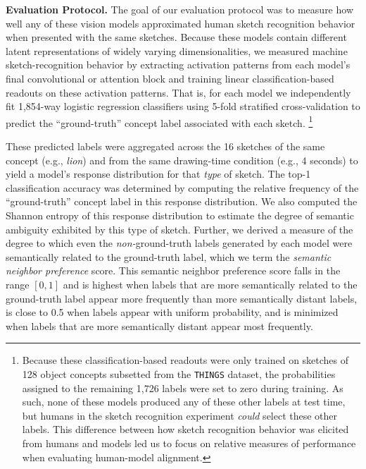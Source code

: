 \documentclass{article}
\begin{document}
\textbf{Evaluation Protocol.}
The goal of our evaluation protocol was to measure how well any of these vision models approximated human sketch recognition behavior when presented with the same sketches. 
Because these models contain different latent representations of widely varying dimensionalities, we measured machine sketch-recognition behavior by extracting activation patterns from each model's final convolutional or attention block and training linear classification-based readouts on these activation patterns. 
That is, for each model we independently fit 1,854-way logistic regression classifiers using 5-fold stratified cross-validation to predict the ``ground-truth'' concept label associated with each sketch.
\footnote{Because these classification-based readouts were only trained on sketches of 128 object concepts subsetted from the \texttt{THINGS} dataset, the probabilities assigned to the remaining 1,726 labels were set to zero during training. As such, none of these models produced any of these other labels at test time, but humans in the sketch recognition experiment \textit{could} select these other labels. This difference between how sketch recognition behavior was elicited from humans and models led us to focus on relative measures of performance when evaluating human-model alignment.} 


These predicted labels were aggregated across the 16 sketches of the same concept (e.g., \textit{lion}) and from the same drawing-time condition (e.g., 4 seconds) to yield a model's response distribution for that \textit{type} of sketch.
The top-1 classification accuracy was determined by computing the relative frequency of the ``ground-truth'' concept label in this response distribution. 
We also computed the Shannon entropy of this response distribution to estimate the degree of semantic ambiguity exhibited by this type of sketch.
Further, we derived a measure of the degree to which even the \textit{non-}ground-truth labels generated by each model were semantically related to the ground-truth label, which we term the \textit{semantic neighbor preference} score.
This semantic neighbor preference score falls in the range $[0,1]$ and is highest when labels that are more semantically related to the ground-truth label appear more frequently than more semantically distant labels, is close to 0.5 when labels appear with uniform probability, and is minimized when labels that are more semantically distant appear most frequently. 
\end{document}
